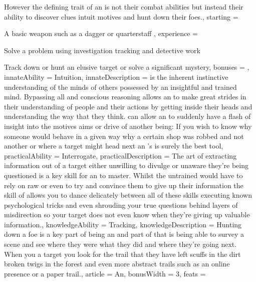 {However\comma{} the defining trait of an \auror{} is not their combat abilities but instead their ability to discover clues\comma{} intuit motives and hunt down their foes.,
	starting = 
\item A basic weapon such as a dagger or quarterstaff
,
	experience = \item Solve a problem using investigation\comma{} tracking and detective work
\item Track down or hunt an elusive target or solve a significant mystery,
	bonuses = 
,
	innateAbility = Intuition,
	innateDescription = \imp{\innateAbility} is the inherent\comma{} instinctive understanding of the minds of others possessed by an insightful and trained mind. Bypassing all  and conscious reasoning\comma{}  allows an \name{} to make great strides in their understanding of people and their actions by getting inside their heads and understanding the way that they think. \imp{\innateAbility} can allow an \bname{} to suddenly have a flash of insight into the motives\comma{} aims or drive of another being: If you wish to know why someone would behave in a given way\comma{} why a certain shop was robbed and not another\comma{} or where a target might head next \minus{} an \name{}'s \imp{\innateAbility} is surely the best tool,
	practicalAbility = Interrogate,
	practicalDescription = The art of extracting information out of a target\comma{} either unwilling to divulge or unaware they're being questioned\comma{} is a key skill for an \bname{} to master.   Whilst the untrained would have to rely on raw \comma{} \comma{}  or even  to try and convince them to give up their information\comma{} the skill of  allows you to dance delicately between all of these skills\comma{} executing known psychological tricks and even shrouding your true questions behind layers of misdirection so your target does not even know when they're giving up valuable information.,
	knowledgeAbility = Tracking,
	knowledgeDescription = Hunting down a foe is a key part of being an \bname{}\comma{} and part of that is being able to survey a scene and see where they were\comma{} what they did\comma{} and where they're going next. When you  a target you look for the trail that they have left \minus{} scuffs in the dirt\comma{} broken twigs in the forest and even more abstract trails such as an online presence or a paper trail.,
	article = An,
	bonusWidth = 3, feats = \AurorFeats
}

